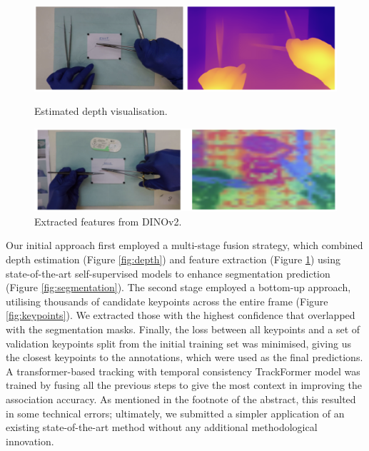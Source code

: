 \documentclass[11pt]{article}
\begin{document}
\begin{figure}[b]
    \centering
    \begin{minipage}{0.49\linewidth}
        \centering
        \includegraphics[width=\linewidth]{depth.png}
        \caption{Estimated depth visualisation.}
        \label{fig:depth}
    \end{minipage}
    \hfill
    \begin{minipage}{0.49\linewidth}
        \centering
        \includegraphics[width=\linewidth]{features.png}
        \caption{Extracted features from DINOv2.}
        \label{fig:features}
    \end{minipage}
\end{figure}

Our initial approach first employed a multi-stage fusion strategy, which combined depth estimation (Figure \ref{fig:depth}) and feature extraction (Figure \ref{fig:features}) using state-of-the-art self-supervised models \cite{oquab_dinov2_2024} to enhance segmentation prediction (Figure \ref{fig:segmentation}). The second stage employed a bottom-up approach, utilising thousands of candidate keypoints across the entire frame (Figure \ref{fig:keypoints}). We extracted those with the highest confidence that overlapped with the segmentation masks. Finally, the loss between all keypoints and a set of validation keypoints split from the initial training set was minimised, giving us the closest keypoints to the annotations, which were used as the final predictions. A transformer-based tracking with temporal consistency TrackFormer model \cite{meinhardt_trackformer_2022} was trained by fusing all the previous steps to give the most context in improving the association accuracy. As mentioned in the footnote of the abstract, this resulted in some technical errors; ultimately, we submitted a simpler application of an existing state-of-the-art method without any additional methodological innovation. 
\end{document}
